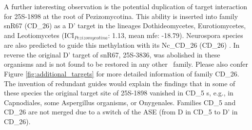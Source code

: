 A further interesting observation is the potential duplication of
target interaction for 25S-1898 at the root of Pezizomycotina. This
ability is inserted into family snR67 (CD\_26) as a D' target in the lineages
Dothideomycetes, Eurotiomycetes, and Leotiomycetes
(ICI$_{Pezizomycotina}$: 1.13, mean
mfe: -18.79). Neurospora species
are also predicted to guide this methylation with its Nc\_CD\_26 (CD\_26) \sno \cite{Liu:2009}. In reverse the
original D' target of snR67, 25S-3836, was abolished in these
organisms and is not found to be restored in any other \sno\ family.
Please also confer Figure \ref{fig:additional_targets} for more
detailed information of family CD\_26. The invention of redundant
guides would explain the findings that in some of these species the original target
site of 25S-1898 vanished in CD\_5 \sno s, e.g., in Capnodiales, some Aspergillus
organisms, or Onygenales. Families CD\_5 and CD\_26 are not merged due
to a switch of the ASE (from D in CD\_5 to D' in CD\_26). 





